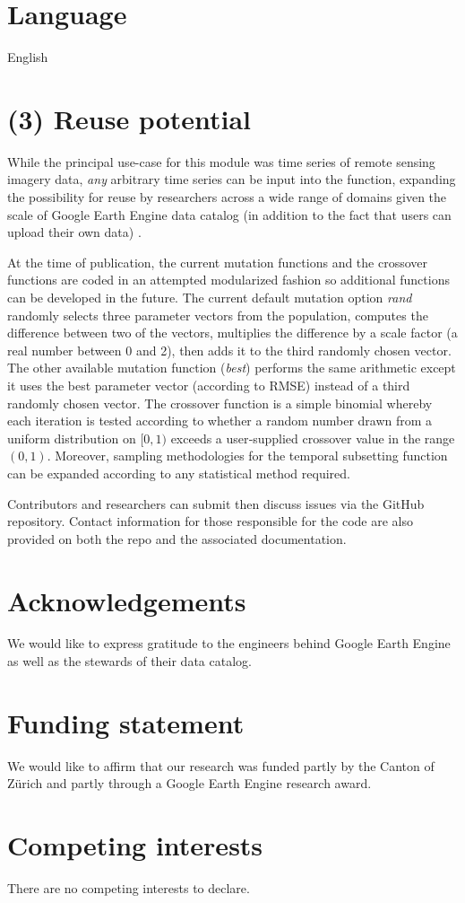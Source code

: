 \documentclass{jors}
\begin{document}
\section*{Language}

English

\section*{(3) Reuse potential}

While the principal use-case for this module was time series of remote sensing imagery data, \textit{any} arbitrary time series can be input into the function, expanding the possibility for reuse by researchers across a wide range of domains given the scale of Google Earth Engine data catalog (in addition to the fact that users can upload their own data) \cite{gorelick2017google}.

At the time of publication, the current mutation functions and the crossover functions are coded in an attempted modularized fashion so additional functions can be developed in the future. The current default mutation option \textit{rand} randomly selects three parameter vectors from the population, computes the difference between two of the vectors, multiplies the difference by a scale factor (a real number between 0 and 2), then adds it to the third randomly chosen vector. The other available mutation function (\textit{best}) performs the same arithmetic except it uses the best parameter vector (according to RMSE) instead of a third randomly chosen vector. The crossover function is a simple binomial whereby each iteration is tested according to whether a random number drawn from a uniform distribution on $[0,1)$ exceeds a user‑supplied crossover value in the range $(0,1)$. Moreover, sampling methodologies for the temporal subsetting function can be expanded according to any statistical method required.

Contributors and researchers can submit then discuss issues via the GitHub repository. Contact information for those responsible for the code are also provided on both the repo and the associated documentation.


\section*{Acknowledgements}

We would like to express gratitude to the engineers behind Google Earth Engine as well as the stewards of their data catalog.

\section*{Funding statement}

We would like to affirm that our research was funded partly by the Canton of Zürich and partly through a Google Earth Engine research award.

\section*{Competing interests}

There are no competing interests to declare.

\printbibliography
\end{document}
